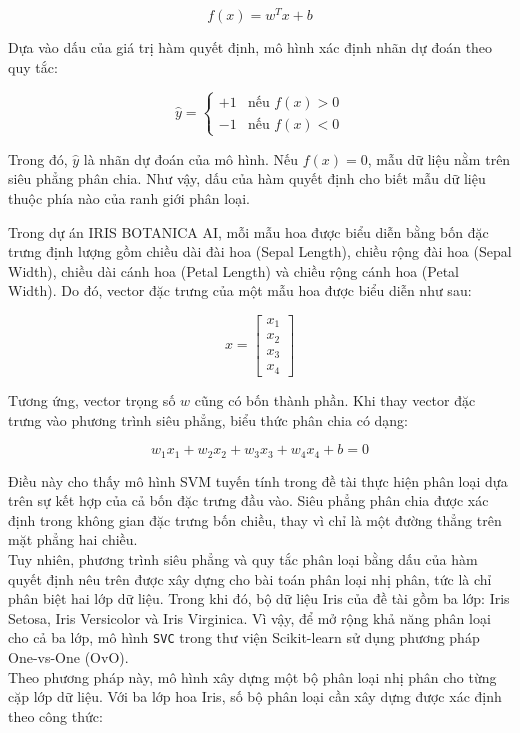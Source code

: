 \documentclass[14pt]{extarticle}
\begin{document}
\[
f(x)=w^Tx+b
\]

\noindent Dựa vào dấu của giá trị hàm quyết định, mô hình xác định nhãn dự đoán theo quy tắc:

\[
\hat{y}=
\begin{cases}
	+1 & \text{nếu } f(x)>0\\
	-1 & \text{nếu } f(x)<0
\end{cases}
\]

\noindent Trong đó, $\hat{y}$ là nhãn dự đoán của mô hình. Nếu $f(x)=0$, mẫu dữ liệu nằm trên siêu phẳng phân chia. Như vậy, dấu của hàm quyết định cho biết mẫu dữ liệu thuộc phía nào của ranh giới phân loại.

\noindent Trong dự án IRIS BOTANICA AI, mỗi mẫu hoa được biểu diễn bằng bốn đặc trưng định lượng gồm chiều dài đài hoa (Sepal Length), chiều rộng đài hoa (Sepal Width), chiều dài cánh hoa (Petal Length) và chiều rộng cánh hoa (Petal Width). Do đó, vector đặc trưng của một mẫu hoa được biểu diễn như sau:

\[
x=
\begin{bmatrix}
	x_1\\
	x_2\\
	x_3\\
	x_4
\end{bmatrix}
\]

\noindent Tương ứng, vector trọng số $w$ cũng có bốn thành phần. Khi thay vector đặc trưng vào phương trình siêu phẳng, biểu thức phân chia có dạng:

\[
w_1x_1+w_2x_2+w_3x_3+w_4x_4+b=0
\]

\noindent Điều này cho thấy mô hình SVM tuyến tính trong đề tài thực hiện phân loại dựa trên sự kết hợp của cả bốn đặc trưng đầu vào. Siêu phẳng phân chia được xác định trong không gian đặc trưng bốn chiều, thay vì chỉ là một đường thẳng trên mặt phẳng hai chiều.\\

\noindent Tuy nhiên, phương trình siêu phẳng và quy tắc phân loại bằng dấu của hàm quyết định nêu trên được xây dựng cho bài toán phân loại nhị phân, tức là chỉ phân biệt hai lớp dữ liệu. Trong khi đó, bộ dữ liệu Iris của đề tài gồm ba lớp: Iris Setosa, Iris Versicolor và Iris Virginica. Vì vậy, để mở rộng khả năng phân loại cho cả ba lớp, mô hình \texttt{SVC} trong thư viện Scikit-learn sử dụng phương pháp One-vs-One (OvO).\\

\noindent Theo phương pháp này, mô hình xây dựng một bộ phân loại nhị phân cho từng cặp lớp dữ liệu. Với ba lớp hoa Iris, số bộ phân loại cần xây dựng được xác định theo công thức:
\end{document}
